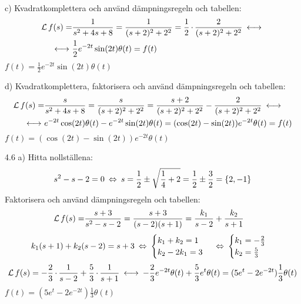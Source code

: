 \begin{task}{c)}
	Kvadratkomplettera och använd dämpningsregeln och tabellen:
	\begin{align*}
	\laplace f(s)=
	&\frac{1}{s^2+4s+8}=
	\frac{1}{(s+2)^2+2^2}=
	\frac{1}{2}\*\frac{2}{(s+2)^2+2^2} \llra \\ \llra
	&\frac{1}{2}e^{-2t}\sin(2t)\theta(t)=
	f(t)
	\end{align*}
	\ans $f(t)=\frac{1}{2}e^{-2t}\sin(2t)\theta(t)$
\end{task}

\begin{task}{d)}
	Kvadratkomplettera, faktorisera och använd dämpningsregeln och tabellen:
	\begin{align*}
	\laplace f(s)=
	&\frac{s}{s^2+4s+8}=
	\frac{s}{(s+2)^2+2^2}=
	\frac{s+2}{(s+2)^2+2^2}-\frac{2}{(s+2)^2+2^2} \llra \\ \llra
	&e^{-2t}\cos(2t)\theta(t)-e^{-2t}\sin(2t)\theta(t)=
	(\cos(2t)-\sin(2t))e^{-2t}\theta(t)=
	f(t)
	\end{align*}
	\ans $f(t)=(\cos(2t)-\sin(2t))e^{-2t}\theta(t)$
\end{task}

\begin{task}{4.6 a)}
	Hitta nollställena:
	\[s^2-s-2=0 \lra
	s=\frac{1}{2}\pm\sqrt{\frac{1}{4}+2}=
	\frac{1}{2}\pm\frac{3}{2}=\{2,-1\}\]
	Faktorisera och använd dämpningsregeln och tabellen:
	\begin{align*}
	\operatorname{\mathcal{L}} f(s)=
	&\frac{s+3}{s^2-s-2}=
	\frac{s+3}{(s-2)(s+1)}=
	\frac{k_1}{s-2}+\frac{k_2}{s+1}
	\end{align*}
	\[k_1(s+1)+k_2(s-2)=s+3 \lra
	\begin{cases}
	k_1+k_2=1 \\
	k_2-2k_1=3
	\end{cases} \lra
	\begin{cases}
	k_1=-\frac{2}{3} \\
	k_2=\frac{5}{3}
	\end{cases} \]
	\begin{align*}
	\laplace f(s)=
	-\frac{2}{3}\*\frac{1}{s-2}+\frac{5}{3}\*\frac{1}{s+1} \llra
	-\frac{2}{3}e^{-2t}\theta(t)+\frac{5}{3}e^{t}\theta(t)=
	(5e^{t}-2e^{-2t})\frac{1}{3}\theta(t)
	\end{align*}
	\ans $f(t)=(5e^{t}-2e^{-2t})\frac{1}{3}\theta(t)$
\end{task}

